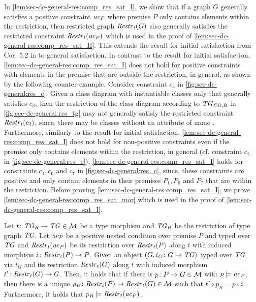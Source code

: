 In \cref{lem:sec-dc-general-res:comp_res_sat_I}, we show that if a graph $G$ generally satisfies a positive constraint $\mathit{ac}_P$ where premise $P$ only contains elements within the restriction, then restricted graph $\mathit{Restr}_t(G)$ also generally satisfies the restricted constraint $\mathit{Restr}_t(\mathit{ac}_P)$ which is used in the proof of \cref{lem:sec-dc-general-res:comp_res_sat_II}.
This extends the result for initial satisfaction from Cor. 5.2 in \cite{DBLP:journals/corr/abs-1209-1436} to general satisfaction.
In contrast to the result for initial satisfaction, \cref{lem:sec-dc-general-res:comp_res_sat_I} does not hold for positive constraints with elements in the premise that are outside the restriction, in general, as shown by the following counter-example.
Consider constraint $c_3$ in \cref{fig:sec-dc-general:res_c}.
Given a class diagram with instantiable classes only that generally satisfies $c_3$, then the restriction of the class diagram according to $\mathit{TG}_{\mathit{CD},R}$ in \cref{fig:sec-dc-general:res_tg} may not generally satisfy the restricted constraint $\mathit{Restr}_t(c_3)$, since, there may be classes without an attribute of name .
Furthermore, similarly to the result for initial satisfaction, \cref{lem:sec-dc-general-res:comp_res_sat_I} does not hold for non-positive constraints even if the premise only contains elements within the restriction, in general (cf. constraint $c_5$ in \cref{fig:sec-dc-general:res_c}).
\cref{lem:sec-dc-general-res:comp_res_sat_I} holds for constraints $c_1,c_6$ and $c_7$ in \cref{fig:sec-dc-general:res_c}, since, these constraints are positive and only contain elements in their premises $P_1,P_6$ and $P_7$ that are within the restriction.
Before proving \cref{lem:sec-dc-general-res:comp_res_sat_I}, we prove \cref{lem:sec-dc-general-res:comp_res_sat_mor} which is used in the proof of \cref{lem:sec-dc-general-res:comp_res_sat_I}.

\begin{lemma}
\label{lem:sec-dc-general-res:comp_res_sat_mor}
Let $t\colon \mathit{TG}_R \to \mathit{TG} \in {\cal M}$ be a type morphism and $\mathit{TG}_R$ be the restriction of type graph $\mathit{TG}$.
Let $\mathit{ac}_P$ be a positive nested condition over premise $P$ and typed over $\mathit{TG}$ and $\mathit{Restr}_t(\mathit{ac}_P)$ be its restriction over $\mathit{Restr}_t(P)$ along $t$ with induced morphism $i\colon \mathit{Restr}_t(P) \to P$.
Given an object $(G,t_G\colon G \to \mathit{TG})$ typed over $\mathit{TG}$ via $t_G$ and its restriction $\mathit{Restr}_t(G)$ along $t$ with induced morphism $t'\colon \mathit{Restr}_t(G) \to G$.
Then, it holds that if there is $p\colon P \to G \in {\cal M}$ with $p \models \mathit{ac}_P$, then there is a unique $p_R\colon \mathit{Restr}_t(P) \to \mathit{Restr}_t(G) \in {\cal M}$ such that $t' \circ p_R=p \circ i$.
Furthermore, it holds that $p_R \models \mathit{Restr}_t(\mathit{ac}_P)$.
\envEndMarker
\end{lemma}

